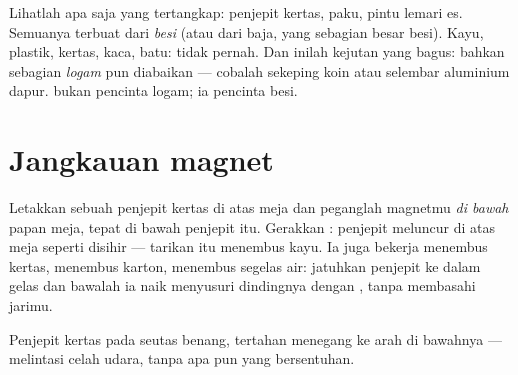 \begin{example}\label{ex:g1:magnets:iron}
Lihatlah apa saja yang tertangkap: penjepit kertas, paku, pintu lemari
es. Semuanya terbuat dari \emph{besi} (atau dari baja, yang sebagian
besar besi). Kayu, plastik, kertas, kaca, batu: tidak pernah. Dan
inilah kejutan yang bagus: bahkan sebagian \emph{logam} pun diabaikan
--- cobalah sekeping koin atau selembar aluminium dapur.  bukan
pencinta logam; ia pencinta besi.
\end{example}

\section{Jangkauan magnet}

\begin{example}\label{ex:g1:magnets:through}
Letakkan sebuah penjepit kertas di atas meja dan peganglah magnetmu
\emph{di bawah} papan meja, tepat di bawah penjepit itu. Gerakkan
: penjepit meluncur di atas meja seperti disihir --- tarikan
itu menembus kayu. Ia juga bekerja menembus kertas, menembus karton,
menembus segelas air: jatuhkan penjepit ke dalam gelas dan bawalah ia
naik menyusuri dindingnya dengan , tanpa membasahi jarimu.
\end{example}

\begin{omfigure}

{\small Penjepit kertas pada seutas benang, tertahan menegang ke arah
 di bawahnya --- melintasi celah udara, tanpa apa pun yang
bersentuhan.}
\end{omfigure}

